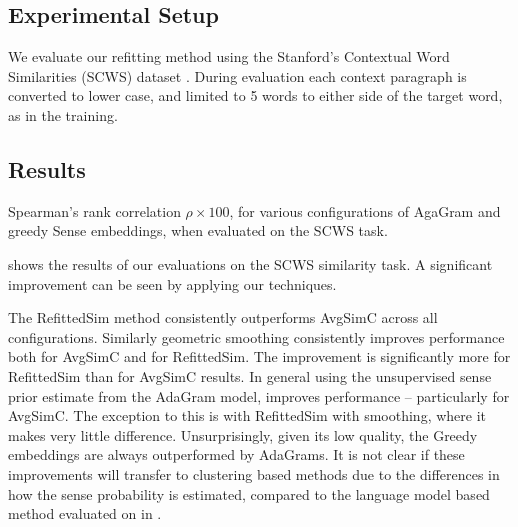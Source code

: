 \documentclass{sig-alternate}
\begin{document}
\subsection{Experimental Setup}
We evaluate our refitting method using the Stanford's Contextual Word Similarities (SCWS) dataset \parencite{Huang2012}.
During evaluation each context paragraph is converted to lower case, and limited to 5 words to either side of the target word, as in the training.


\subsection{Results}

\begin{table}
	\begin{adjustbox}{max width=\columnwidth}
	\end{adjustbox}

\caption{Spearman's rank correlation $\rho \times 100$, for various configurations of AgaGram and greedy Sense embeddings, when evaluated on the SCWS task.} \label{swscres}
\end{table}

 shows the results of our evaluations on the SCWS similarity task. A significant improvement can be seen by applying our techniques.

The RefittedSim method consistently outperforms AvgSimC across all configurations.
Similarly geometric smoothing consistently improves performance both for AvgSimC and for RefittedSim. The improvement is significantly more for RefittedSim than for AvgSimC results.
In general using the unsupervised sense prior estimate from the AdaGram model, improves performance -- particularly for AvgSimC. The exception to this is with RefittedSim with smoothing, where it makes very little difference. 
Unsurprisingly, given its low quality, the Greedy embeddings are always outperformed by AdaGrams.
It is not clear if these improvements will transfer to clustering based methods due to the differences in how the sense probability is estimated, compared to the language model based method evaluated on in .
\end{document}
